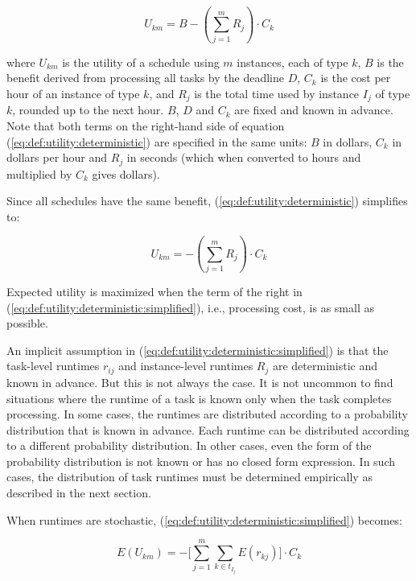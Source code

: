 \documentclass[12pt]{report}
\begin{document}
\begin{equation}
\label{eq:def:utility:deterministic}
	U_{km} = B - \left(\sum_{j=1}^{m} R_{j} \right) \cdot C_k
\end{equation}

where $U_{km}$ is the utility of a schedule using $m$ instances, each of type $k$, $B$ is the benefit derived from processing all tasks by the deadline $D$, $C_k$ is the cost per hour of an instance of type $k$, and $R_j$ is the total time used by instance $I_j$ of type $k$, rounded up to the next hour.
$B$, $D$ and $C_k$ are fixed and known in advance.
Note that both terms on the right-hand side of equation (\ref{eq:def:utility:deterministic}) are specified in the same units: $B$ in dollars, $C_k$ in dollars per hour and $R_j$ in seconds (which when converted to hours and multiplied by $C_k$ gives dollars).

Since all schedules have the same benefit, (\ref{eq:def:utility:deterministic}) simplifies to:

\begin{equation}
\label{eq:def:utility:deterministic:simplified}
	U_{km} = - \left(\sum_{j=1}^{m} R_{j} \right) \cdot C_k
\end{equation}

Expected utility is maximized when the term of the right in  (\ref{eq:def:utility:deterministic:simplified}), i.e., processing cost, is as small as possible.

An implicit assumption in (\ref{eq:def:utility:deterministic:simplified}) is that the task-level runtimes $r_{ij}$ and instance-level runtimes $R_j$ are deterministic and known in advance.
But this is not always the case.
It is not uncommon to find situations where the runtime of a task is known only when the task completes processing.
In some cases, the runtimes are distributed according to a probability distribution that is known in advance.
Each runtime can be distributed according to a different probability distribution.
In other cases, even the form of the probability distribution is not known or has no closed form expression.
In such cases, the distribution of task runtimes must be determined empirically as described in the next section.

When runtimes are stochastic, (\ref{eq:def:utility:deterministic:simplified}) becomes:

\begin{equation}
\label{eq:def:utility:stochastic}
	E(U_{km}) = - \bigg[\sum_{j=1}^{m} \sum_{k \in t_{I_j}} E(r_{kj}) \bigg] \cdot C_k
\end{equation}
\end{document}
